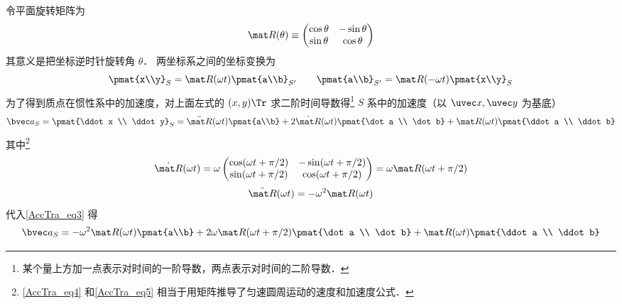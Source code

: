 令平面旋转矩阵为%
\begin{equation}
\mat R(\theta) \equiv \begin{pmatrix}
\cos \theta & - \sin \theta \\
\sin \theta & \cos \theta
\end{pmatrix}
\end{equation}
其意义是把坐标逆时针旋转角 $\theta$． 两坐标系之间的坐标变换为
\begin{equation}
\pmat{x\\y}_{S} = \mat R(\omega t) \pmat{a\\b}_{S'}
\qquad
\pmat{a\\b}_{S'} = \mat R(-\omega t) \pmat{x\\y}_{S}
\end{equation}
为了得到质点在惯性系中的加速度，对上面左式的 $(x,y)\Tr$ 求二阶时间导数得\footnote{某个量上方加一点表示对时间的一阶导数，两点表示对时间的二阶导数．} $S$ 系中的加速度（以 $\uvec x, \uvec y$ 为基底）
\begin{equation}\label{AccTra_eq3}
\bvec a_{S} = \pmat{\ddot x \\ \ddot y}_{S} = 
\ddot{\mat R}(\omega t) \pmat{a\\b} + 2\dot{\mat R} (\omega t) \pmat{\dot a \\ \dot b} + \mat R(\omega t)\pmat{\ddot a \\ \ddot b}
\end{equation}
其中\footnote{\autoref{AccTra_eq4} 和\autoref{AccTra_eq5} 相当于用矩阵推导了匀速圆周运动的速度和加速度公式．}
\begin{equation}\label{AccTra_eq4}
\dot{\mat R}(\omega t) = \omega \begin{pmatrix}
\cos(\omega t + \pi /2) &  - \sin(\omega t + \pi /2)\\
\sin(\omega t + \pi /2) & \cos(\omega t + \pi /2)
\end{pmatrix}
= \omega \mat R(\omega t + \pi /2)
\end{equation}
\begin{equation}\label{AccTra_eq5}
\ddot{\mat R} (\omega t)  =  - \omega ^2 \mat R (\omega t)
\end{equation}
 代入\autoref{AccTra_eq3} 得
\begin{equation}
\bvec a_{S} =
- \omega ^2 \mat R(\omega t)\pmat{a\\b} + 2\omega \mat R(\omega t + \pi /2)\pmat{\dot a \\ \dot b} + \mat R(\omega t)\pmat{\ddot a \\ \ddot b}
\end{equation}
